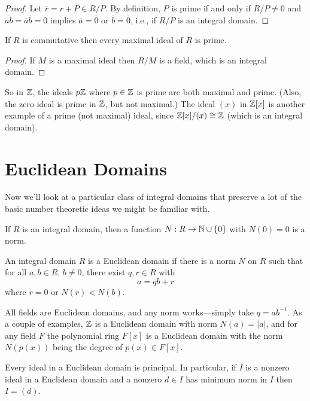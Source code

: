 \documentclass[../m171main.tex]{subfiles}
\begin{document}
\begin{proof}
    Let $\overline r = r + P \in R / P$.
    By definition, $P$ is prime if and only if $R / P \neq 0$ and $\overline{ab} = \overline a \overline b = 0$ implies $\overline a = \overline 0$ or $\overline b = \overline 0$, i.e., if $R / P$ is an integral domain.
\end{proof}

\begin{corollary}[]
    If $R$ is commutative then every maximal ideal of $R$ is prime.
\end{corollary}

\begin{proof}
    If $M$ is a maximal ideal then $R / M$ is a field, which is an integral domain.
\end{proof}

So in $\mathbb{Z}$, the ideals $p\mathbb{Z}$ where $p \in \mathbb{Z}$ is prime are both maximal and prime.
(Also, the zero ideal is prime in $\mathbb{Z}$, but not maximal.)
The ideal $(x)$ in $\mathbb{Z}[x]$ is another example of a prime (not maximal) ideal, since $\mathbb{Z}[x] / (x) \cong \mathbb{Z}$ (which is an integral domain).

\section{Euclidean Domains}
Now we'll look at a particular class of integral domains that preserve a lot of the basic number theoretic ideas we might be familiar with.

\begin{definition}[Norm]
    If $R$ is an integral domain, then a function $N : R \to \mathbb{N} \cup \left\{ 0 \right\}$ with $N(0) = 0$ is a norm.
\end{definition}

\begin{definition}
    An integral domain $R$ is a Euclidean domain if there is a norm $N$ on $R$ such that for all $a,b \in R$, $b \neq 0$, there exist $q,r \in R$ with
    \[ a = qb + r \]
    where $r = 0$ or $N(r) < N(b)$.
\end{definition}

All fields are Euclidean domains, and any norm works---simply take $q = ab^{-1}$.
As a couple of examples, $\mathbb{Z}$ is a Euclidean domain with norm $N(a) = |a|$, and for any field $F$ the polynomial ring $F[x]$ is a Euclidean domain with the norm $N(p(x))$ being the degree of $p(x) \in F[x]$.

\begin{theorem}[]
    Every ideal in a Euclidean domain is principal.
    In particular, if $I$ is a nonzero ideal in a Euclidean domain and a nonzero $d \in I$ has minimum norm in $I$ then $I = (d)$.
\end{theorem}
\end{document}
